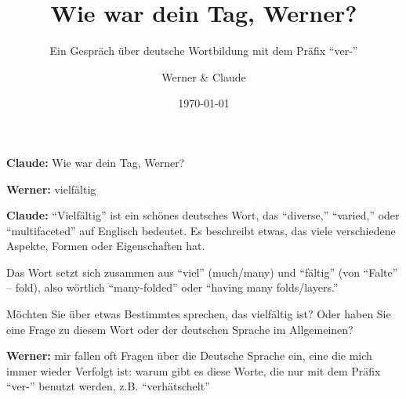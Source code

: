 \documentclass[11pt,a4paper]{scrartcl}
\title{Wie war dein Tag, Werner?}
\subtitle{Ein Gespräch über deutsche Wortbildung mit dem Präfix "`ver-"'}
\author{Werner \& Claude}
\date{\today}
\begin{document}
\maketitle

\begin{claudebox}
\textbf{Claude:} Wie war dein Tag, Werner?
\end{claudebox}

\begin{humanbox}
\textbf{Werner:} vielfältig
\end{humanbox}

\begin{claudebox}
\textbf{Claude:} "`Vielfältig"' ist ein schönes deutsches Wort, das "`diverse,"' "`varied,"' oder "`multifaceted"' auf Englisch bedeutet. Es beschreibt etwas, das viele verschiedene Aspekte, Formen oder Eigenschaften hat.

Das Wort setzt sich zusammen aus "`viel"' (much/many) und "`fältig"' (von "`Falte"' -- fold), also wörtlich "`many-folded"' oder "`having many folds/layers."'

Möchten Sie über etwas Bestimmtes sprechen, das vielfältig ist? Oder haben Sie eine Frage zu diesem Wort oder der deutschen Sprache im Allgemeinen?
\end{claudebox}

\begin{humanbox}
\textbf{Werner:} mir fallen oft Fragen über die Deutsche Sprache ein, eine die mich immer wieder Verfolgt ist: warum gibt es diese Worte, die nur mit dem Präfix "`ver-"' benutzt werden, z.B. "`verhätschelt"'
\end{humanbox}
\end{document}
